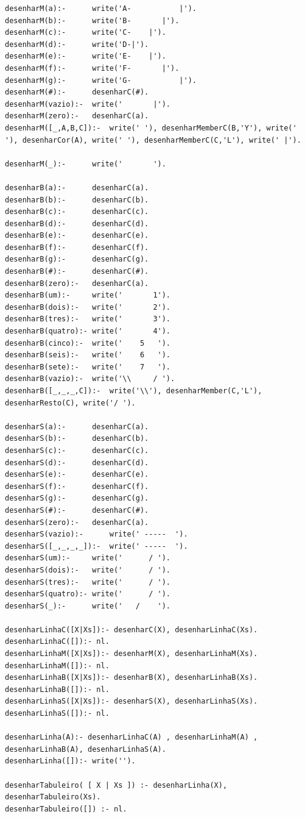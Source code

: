 \documentclass[a4paper]{article}
\begin{document}
\begin{lstlisting}
desenharM(a):-      write('A-           |').
desenharM(b):-      write('B-       |').
desenharM(c):-      write('C-    |').
desenharM(d):-      write('D-|').
desenharM(e):-      write('E-    |').
desenharM(f):-      write('F-       |').
desenharM(g):-      write('G-           |').
desenharM(#):-      desenharC(#).
desenharM(vazio):-  write('       |').
desenharM(zero):-   desenharC(a).
desenharM([_,A,B,C]):-  write(' '), desenharMemberC(B,'Y'), write(' '), desenharCor(A), write(' '), desenharMemberC(C,'L'), write(' |').

desenharM(_):-      write('       ').

desenharB(a):-      desenharC(a).
desenharB(b):-      desenharC(b).
desenharB(c):-      desenharC(c).
desenharB(d):-      desenharC(d).
desenharB(e):-      desenharC(e).
desenharB(f):-      desenharC(f).
desenharB(g):-      desenharC(g).
desenharB(#):-      desenharC(#).
desenharB(zero):-   desenharC(a).
desenharB(um):-     write('       1').
desenharB(dois):-   write('       2').
desenharB(tres):-   write('       3').
desenharB(quatro):- write('       4').
desenharB(cinco):-  write('    5   ').
desenharB(seis):-   write('    6   ').
desenharB(sete):-   write('    7   ').
desenharB(vazio):-  write('\\     / ').
desenharB([_,_,_,C]):-  write('\\'), desenharMember(C,'L'), desenharResto(C), write('/ ').

desenharS(a):-      desenharC(a).
desenharS(b):-      desenharC(b).
desenharS(c):-      desenharC(c).
desenharS(d):-      desenharC(d).
desenharS(e):-      desenharC(e).
desenharS(f):-      desenharC(f).
desenharS(g):-      desenharC(g).
desenharS(#):-      desenharC(#).
desenharS(zero):-   desenharC(a).
desenharS(vazio):-      write(' -----  ').
desenharS([_,_,_,_]):-  write(' -----  ').
desenharS(um):-     write('      / ').
desenharS(dois):-   write('      / ').
desenharS(tres):-   write('      / ').
desenharS(quatro):- write('      / ').
desenharS(_):-      write('   /    ').

desenharLinhaC([X|Xs]):- desenharC(X), desenharLinhaC(Xs).
desenharLinhaC([]):- nl.
desenharLinhaM([X|Xs]):- desenharM(X), desenharLinhaM(Xs).
desenharLinhaM([]):- nl.
desenharLinhaB([X|Xs]):- desenharB(X), desenharLinhaB(Xs).
desenharLinhaB([]):- nl.
desenharLinhaS([X|Xs]):- desenharS(X), desenharLinhaS(Xs).
desenharLinhaS([]):- nl.

desenharLinha(A):- desenharLinhaC(A) , desenharLinhaM(A) , desenharLinhaB(A), desenharLinhaS(A).
desenharLinha([]):- write('').

desenharTabuleiro( [ X | Xs ]) :- desenharLinha(X), desenharTabuleiro(Xs).
desenharTabuleiro([]) :- nl.

\end{lstlisting}
\end{document}
